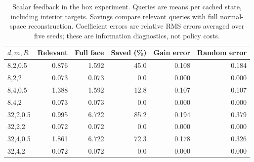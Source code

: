 \begin{table}[htbp]
\centering\small
\caption{Scalar feedback in the box experiment. Queries are means per cached state, including interior targets. Savings compare relevant queries with full normal-space reconstruction. Coefficient errors are relative RMS errors averaged over five seeds; these are information diagnostics, not policy costs.}\label{tab:minimal-feedback}
\begin{tabular}{lrrrrr}\toprule
$d,m,R$ & Relevant & Full face & Saved (\%) & Gain error & Random error\\\midrule
8,2,0.5 & 0.876 & 1.592 & 45.0 & 0.108 & 0.184\\
8,2,2 & 0.073 & 0.073 & 0.0 & 0.000 & 0.000\\
8,4,0.5 & 1.388 & 1.592 & 12.8 & 0.107 & 0.107\\
8,4,2 & 0.073 & 0.073 & 0.0 & 0.000 & 0.000\\
32,2,0.5 & 0.995 & 6.722 & 85.2 & 0.194 & 0.379\\
32,2,2 & 0.072 & 0.072 & 0.0 & 0.000 & 0.000\\
32,4,0.5 & 1.861 & 6.722 & 72.3 & 0.178 & 0.326\\
32,4,2 & 0.072 & 0.072 & 0.0 & 0.000 & 0.000\\
\bottomrule\end{tabular}
\end{table}
